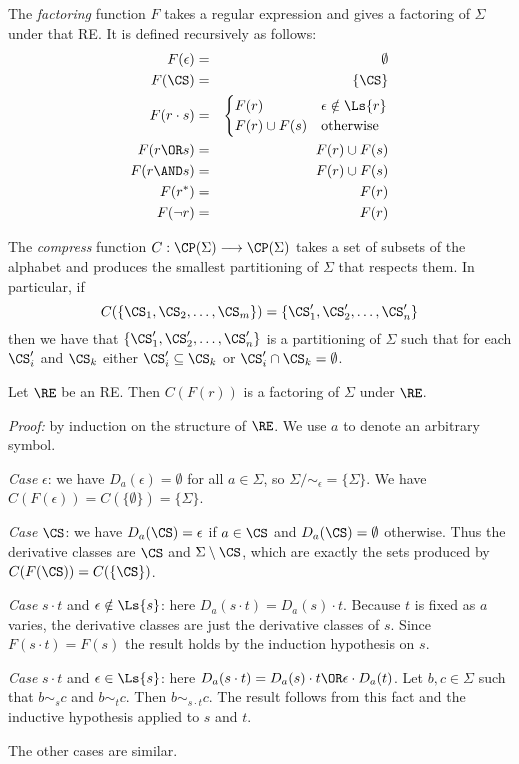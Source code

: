 The \emph{factoring} function $F$ takes a regular expression and gives a factoring of $\Sigma$ under that RE.  It is defined recursively as follows:
\begin{eqnarray*}
F(\epsilon)     &=& \emptyset \\
F(\CS)          &=& \{ \CS \} \\
F(r \cdot s)    &=&
    \begin{cases}
        F(r) & \epsilon \notin \Ls{r} \\
        F(r) \cup F(s) & \textrm{otherwise}
    \end{cases} \\
F(r \OR s)      &=& F(r) \cup F(s) \\
F(r \AND s)     &=& F(r) \cup F(s) \\
F(r^*)          &=& F(r) \\
F(\neg r)       &=& F(r)
\end{eqnarray*}

The \emph{compress} function $C : \CP(\Sigma) \longrightarrow \CP(\Sigma)$ takes a set of subsets of the alphabet and produces the smallest partitioning of $\Sigma$ that respects them.  In particular, if
\[ C(\{\CS_1, \CS_2, \dots, \CS_m \}) = \{ \CS'_1, \CS'_2, \dots, \CS'_n \} \]
then we have that $\{ \CS'_1, \CS'_2, \dots, \CS'_n \}$ is a partitioning of $\Sigma$ such that for each $\CS'_i$ and $\CS_k$ either $\CS'_i \subseteq \CS_k$ or $\CS'_i \cap \CS_k = \emptyset$.

\begin{theorem}  Let $\RE$ be an RE.  Then $C(F(r))$ is a factoring of $\Sigma$ under $\RE$.
\end{theorem}

\emph{Proof:} by induction on the structure of $\RE$.  We use $a$ to denote an arbitrary symbol.

\vskip 5pt
\emph{Case} $\epsilon$: we have $D_a(\epsilon) = \emptyset$ for all $a \in \Sigma$, so $\Sigma/{\sim_\epsilon} = \{ \Sigma \}$.  We have $C(F(\epsilon)) = C(\{ \emptyset \})= \{ \Sigma \}$.

\vskip 5pt
\emph{Case} $\CS$: we have $D_a(\CS) = \epsilon$ if $a \in \CS$ and $D_a(\CS) = \emptyset$ otherwise. Thus the derivative classes are $\CS$ and $\Sigma \setminus \CS$, which are exactly the sets produced by $C(F(\CS)) = C(\{ \CS \})$.

\vskip 5pt
\emph{Case} $s \cdot t$ and $\epsilon \notin \Ls{s}$:  here $D_a(s \cdot t) = D_a(s) \cdot t$. Because $t$ is fixed as $a$ varies, the derivative classes are just the derivative classes of $s$.  Since $F(s \cdot t) = F(s)$ the result holds by the induction hypothesis on $s$.

\vskip 5pt
\emph{Case} $s \cdot t$ and $\epsilon \in \Ls{s}$: here $D_a(s \cdot t) = D_a(s) \cdot t \OR \epsilon \cdot D_a(t)$.  Let $b, c \in \Sigma$ such that $b \sim_s c$ and $b \sim_t c$.  Then $b \sim_{s \cdot t} c$.  The result follows from this fact and the inductive hypothesis applied to $s$ and $t$.

\vskip 5pt
The other cases are similar.